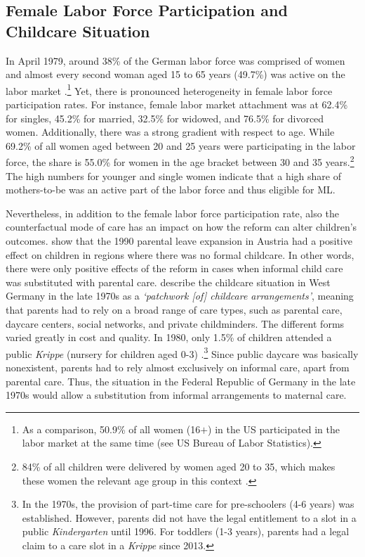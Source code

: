\documentclass[11pt, a4paper, draft]{article} %
\begin{document}
\bigskip
\subsection{Female Labor Force Participation and Childcare Situation}
In April 1979, around 38\% of the German labor force was comprised of women and almost every second woman aged 15 to 65 years (49.7\%) was active on the labor market \citep{federalstatisticaloffice1981yearbook}.\footnote{As a comparison, 50.9\% of all women (16$+$) in the US participated in the labor market at the same time (see US Bureau of Labor Statistics).} Yet, there is pronounced heterogeneity in female labor force participation rates. For instance, female labor market attachment was at 62.4\% for singles, 45.2\% for married, 32.5\% for widowed, and 76.5\% for divorced women. Additionally, there was a strong gradient with respect to age. While 69.2\% of all women aged between 20 and 25 years were participating in the labor force, the share is 55.0\% for women in the age bracket between 30 and 35 years.\footnote{84\% of all children were delivered by
women aged 20 to 35, which makes these women the relevant age group in this context \citep{federalstatisticaloffice1981yearbook}.} The high numbers for younger and single women indicate that a high share of mothers-to-be was an active part of the labor force and thus eligible for ML.

Nevertheless, in addition to the female labor force participation rate, also the counterfactual mode of care has an impact on how the reform can alter children's outcomes. \cite{danzer2019parental} show that the 1990 parental leave expansion in Austria had a positive effect on children in regions where there was no formal childcare. In other words, there were only positive effects of the reform in cases when informal child care was substituted with parental care. \cite{hank2001childcare} describe the childcare situation in West Germany in the late 1970s as a \textit{`patchwork [of] childcare arrangements'}, meaning that parents had to rely on a broad range of care types, such as parental care, daycare centers, social networks, and private childminders. The different forms varied greatly in cost and quality. In 1980, only 1.5\% of children attended a public \textit{Krippe} (nursery for children aged 0-3) \citep[p.~34]{bildungsbericht2006}.\footnote{In the 1970s, the provision of part-time care for pre-schoolers (4-6 years) was established. However, parents did not have the legal entitlement to a slot in a public \textit{Kindergarten} until 1996. For toddlers (1-3 years), parents had a legal claim to a care slot in a \textit{Krippe} since 2013.} Since public daycare was basically nonexistent, parents had to rely almost exclusively on informal care, apart from parental care. Thus, the situation in the Federal Republic of Germany in the late 1970s would allow a substitution from informal arrangements to maternal care. 
\end{document}
